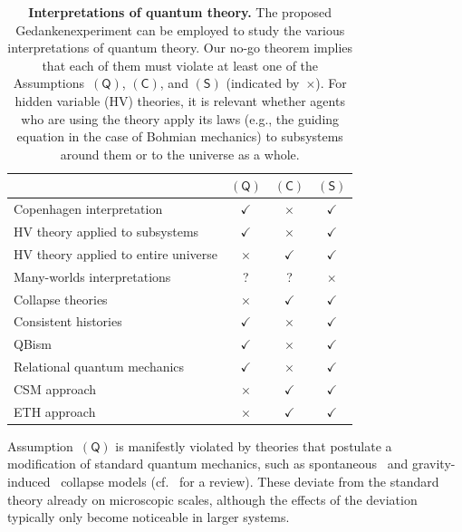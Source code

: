 \documentclass{article}
\theoremstyle{mystyle}
\theoremstyle{definition}
\newcommand*{\QT}{\mathsf{(Q)}}
\newcommand*{\SW}{\mathsf{(S)}}
\newcommand*{\SelfCons}{\mathsf{(C)}}
\begin{document}
{
\newcommand*{\lC}[1]{{\footnotesize #1}}
\begin{table}
\begin{center}
\begin{tabular}{p{5.5cm}ccc}
\toprule
 & $\QT$ & $\SelfCons$ & $\SW$ \\[0.1ex]
\midrule
\lC{Copenhagen interpretation} & $\checkmark$ & $\times$ & $\checkmark$ \\[-0.5ex]
\lC{HV theory applied to subsystems} & $\checkmark$ & $\times$ & $\checkmark$ \\[-0.5ex]
\lC{HV theory applied to entire universe} & $\times$ & $\checkmark$ & $\checkmark$  \\[-0.5ex]
\lC{Many-worlds interpretations} & ? & ? & $\times$ \\[-0.5ex]
\lC{Collapse theories} & $\times$ & $\checkmark$ & $\checkmark$ \\[-0.5ex]
\lC{Consistent histories} & $\checkmark$ & $\times$ & $\checkmark$ \\[-0.5ex]
\lC{QBism} & $\checkmark$ & $\times$ & $\checkmark$ \\[-0.5ex]
\lC{Relational quantum mechanics} & $\checkmark$ & $\times$ & $\checkmark$ \\[-0.5ex]
\lC{CSM approach} & $\times$ & $\checkmark$ & $\checkmark$ \\[-0.5ex]
\lC{ETH approach} & $\times$ & $\checkmark$ & $\checkmark$ \\[-0.1ex]
  \bottomrule
\end{tabular}
  \vspace{-2ex}
\end{center}
\caption{{\bf Interpretations of quantum theory.}  The proposed Gedankenexperiment can be employed to study the various interpretations of quantum theory. Our no-go theorem implies that each of them must violate at least one of the Assumptions~$\QT$, $\SelfCons$, and $\SW$ (indicated by~$\times$). For hidden variable (HV) theories,  it is relevant whether agents who are using the theory apply its laws  (e.g., the guiding equation in the case of Bohmian mechanics)  to subsystems around them or to the universe as a whole.\label{tab_interpretations}}

\end{table}
}

Assumption~$\QT$ is manifestly violated by theories that postulate a modification of  standard quantum mechanics, such as spontaneous~\cite{GhRiWe86,Gisin89,Pearle89, Tumulka06,Weinberg12} and gravity-induced~\cite{Karolyhazy66,Diosi89,Penrose96} collapse models (cf.\ \cite{Bassietal13} for a review).
These deviate from the standard theory already on microscopic scales, although the effects of the deviation typically only become noticeable in larger systems. 
\end{document}
